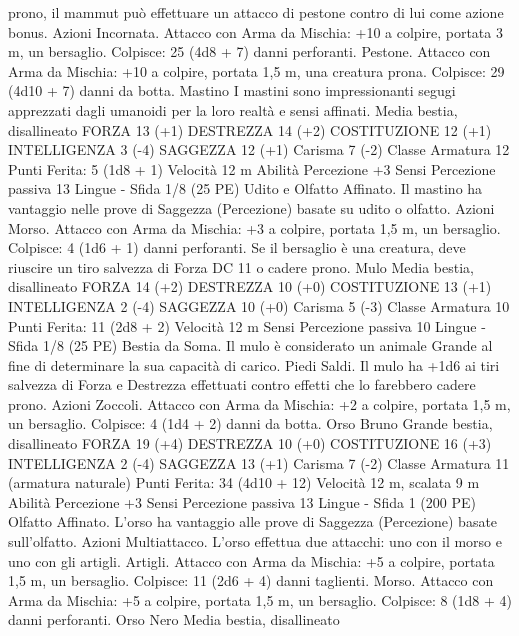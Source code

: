 \begin{multicols}{2}
prono, il mammut può effettuare un attacco di pestone contro di
lui come azione bonus.
Azioni
Incornata. Attacco con Arma da Mischia: +10 a colpire, portata
3 m, un bersaglio.
Colpisce: 25 (4d8 + 7) danni perforanti.
Pestone. Attacco con Arma da Mischia: +10 a colpire, portata
1,5 m, una creatura prona.
Colpisce: 29 (4d10 + 7) danni da botta.
Mastino
I mastini sono impressionanti segugi apprezzati dagli
umanoidi per la loro realtà e sensi affinati.
Media bestia, disallineato
FORZA 13 (+1)
DESTREZZA 14 (+2)
COSTITUZIONE 12 (+1)
INTELLIGENZA 3 (-4)
SAGGEZZA 12 (+1)
Carisma 7 (-2)
Classe Armatura 12
\hspace*{0pt}\hfill{Punti Ferita}: 5 (1d8 + 1)
Velocità 12 m
Abilità Percezione +3
Sensi Percezione passiva 13
Lingue -
Sfida 1/8 (25 PE)
Udito e Olfatto Affinato. Il mastino ha vantaggio nelle prove di
Saggezza (Percezione) basate su udito o olfatto.
Azioni
Morso. Attacco con Arma da Mischia: +3 a colpire, portata 1,5
m, un bersaglio.
Colpisce: 4 (1d6 + 1) danni perforanti. Se il bersaglio è una creatura,
deve riuscire un tiro salvezza di Forza DC 11 o cadere prono.
Mulo
Media bestia, disallineato
FORZA 14 (+2)
DESTREZZA 10 (+0)
COSTITUZIONE 13 (+1)
INTELLIGENZA 2 (-4)
SAGGEZZA 10 (+0)
Carisma 5 (-3)
Classe Armatura 10
\hspace*{0pt}\hfill{Punti Ferita}: 11 (2d8 + 2)
Velocità 12 m
Sensi Percezione passiva 10
Lingue -
Sfida 1/8 (25 PE)
Bestia da Soma. Il mulo è considerato un animale Grande al fine
di determinare la sua capacità di carico.
Piedi Saldi. Il mulo ha +1d6 ai tiri salvezza di Forza e
Destrezza effettuati contro effetti che lo farebbero cadere prono.
Azioni
Zoccoli. Attacco con Arma da Mischia: +2 a colpire, portata 1,5
m, un bersaglio.
Colpisce: 4 (1d4 + 2) danni da botta.
Orso Bruno
Grande bestia, disallineato
FORZA 19 (+4)
DESTREZZA 10 (+0)
COSTITUZIONE 16 (+3)
INTELLIGENZA 2 (-4)
SAGGEZZA 13 (+1)
Carisma 7 (-2)
Classe Armatura 11 (armatura naturale)
\hspace*{0pt}\hfill{Punti Ferita}: 34 (4d10 + 12)
Velocità 12 m, scalata 9 m
Abilità Percezione +3
Sensi Percezione passiva 13
Lingue -
Sfida 1 (200 PE)
Olfatto Affinato. L’orso ha vantaggio alle prove di Saggezza
(Percezione) basate sull’olfatto.
Azioni
Multiattacco. L’orso effettua due attacchi: uno con il morso e
uno con gli artigli.
Artigli. Attacco con Arma da Mischia: +5 a colpire, portata 1,5
m, un bersaglio.
Colpisce: 11 (2d6 + 4) danni taglienti.
Morso. Attacco con Arma da Mischia: +5 a colpire, portata 1,5
m, un bersaglio.
Colpisce: 8 (1d8 + 4) danni perforanti.
Orso Nero
Media bestia, disallineato

\end{multicols}
